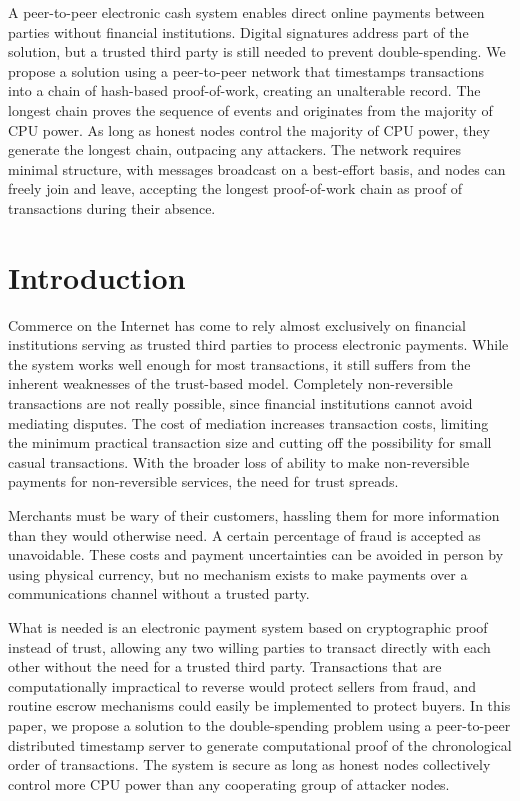 \documentclass{article}
\begin{document}
A peer-to-peer electronic cash system enables direct online payments between parties without financial institutions. Digital signatures address part of the solution, but a trusted third party is still needed to prevent double-spending. We propose a solution using a peer-to-peer network that timestamps transactions into a chain of hash-based proof-of-work, creating an unalterable record. The longest chain proves the sequence of events and originates from the majority of CPU power. As long as honest nodes control the majority of CPU power, they generate the longest chain, outpacing any attackers. The network requires minimal structure, with messages broadcast on a best-effort basis, and nodes can freely join and leave, accepting the longest proof-of-work chain as proof of transactions during their absence.

\section{Introduction}

Commerce on the Internet has come to rely almost exclusively on financial institutions serving as trusted third parties to process electronic payments. While the system works well enough for most transactions, it still suffers from the inherent weaknesses of the trust-based model. Completely non-reversible transactions are not really possible, since financial institutions cannot avoid mediating disputes. The cost of mediation increases transaction costs, limiting the minimum practical transaction size and cutting off the possibility for small casual transactions. With the broader loss of ability to make non-reversible payments for non-reversible services, the need for trust spreads.

Merchants must be wary of their customers, hassling them for more information than they would otherwise need. A certain percentage of fraud is accepted as unavoidable. These costs and payment uncertainties can be avoided in person by using physical currency, but no mechanism exists to make payments over a communications channel without a trusted party.

What is needed is an electronic payment system based on cryptographic proof instead of trust, allowing any two willing parties to transact directly with each other without the need for a trusted third party. Transactions that are computationally impractical to reverse would protect sellers from fraud, and routine escrow mechanisms could easily be implemented to protect buyers. In this paper, we propose a solution to the double-spending problem using a peer-to-peer distributed timestamp server to generate computational proof of the chronological order of transactions. The system is secure as long as honest nodes collectively control more CPU power than any cooperating group of attacker nodes.
\end{document}
